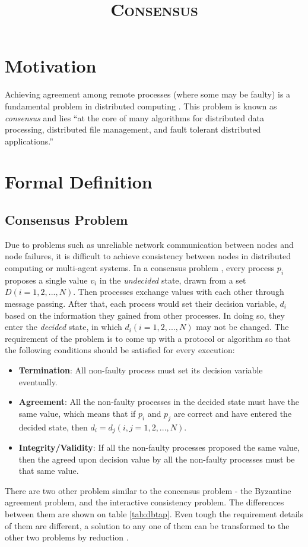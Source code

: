 \documentclass[12pt, a4paper]{article}
\title{\textsc{Consensus}}
\author{}
\date{}
\begin{document}
\maketitle


\section{Motivation}

Achieving agreement among remote processes (where some may be faulty) is a
fundamental problem in distributed computing \cite{fischer1985impossibility}.
This problem is known as \textit{consensus} and lies ``at the core of many
algorithms for distributed data processing, distributed file management, and
fault tolerant distributed applications.'' \cite{fischer1985impossibility}

\section{Formal Definition}
\subsection{Consensus Problem}
Due to problems such as unreliable network communication between nodes and node failures, it is difficult to achieve consistency between nodes in distributed computing or multi-agent systems. In a consensus problem \cite{coulouris2005distributed}, every process $p_{i}$ proposes a single value $v_{i}$ in the \textit{undecided} state, drawn from a set $D(i = 1,2,...,N)$. Then processes exchange values with each other through message passing. After that, each process would set their decision variable, $d_{i}$ based on the information they gained from other processes. In doing so, they enter the \textit{decided} state, in which $d_{i} (i = 1, 2, ..., N)$ may not be changed. The requirement of the problem is to come up with a protocol or algorithm so that the following conditions should be satisfied for every execution:
\begin{itemize}
	\item \textbf{Termination}: All non-faulty process must set its decision variable eventually.
	\item \textbf{Agreement}: All the non-faulty processes in the decided state must have the same value, which means that if $p_{i}$ and $p_{j}$ are correct and have entered the decided state, then $d_{i} = d_{j}(i, j = 1, 2, ..., N)$.
	\item \textbf{Integrity/Validity}: If all the non-faulty processes proposed the same value, then the agreed upon decision value by all the non-faulty processes must be that same value.
\end{itemize}
There are two other problem similar to the concensus problem - the Byzantine agreement problem, and the interactive consistency problem. The differences between them are shown on table \ref{tab:dbtap}. Even tough the requirement details of them are different, a solution to any one of them can be transformed to the other two problems by reduction \cite{fischer1983consensus}. 
\end{document}
